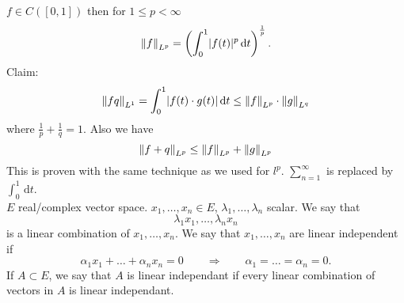\begin{bemerkung}
	$f \in C([0,1])$ then for $1 \leq p < \infty$
	\[
		\norm{f}_{L^p} = \left( \int_{0}^{1} \abs{f(t)}^p \,\mathrm{d}t \right)^{\frac{1}{p}}.
	\]
	Claim:
	\begin{align*}
		\norm{fq}_{L^1} = \int_{0}^{1} \abs{f(t)\cdot g(t)} \,\mathrm{d}t \leq \norm{f}_{L^p} \cdot \norm{g}_{L^q}
	\end{align*}
	where $\frac{1}{p}+ \frac{1}{q}= 1$. Also we have
	\[
		\norm{f+q}_{L^p} \leq \norm{f}_{L^p}+ \norm{g}_{L^p}
	\]
	This is proven with the same technique as we used for $l^p$. $\sum_{n=1}^{\infty}$ is replaced by $\int_{0}^{1} \,\mathrm{d}t$. \\
	$E$ real/complex vector space. $x_1, \dots,x_n \in E$, $\lambda_1, \dots, \lambda_n$ scalar. We say that 
	\[
		\lambda_1 x_1, \dots, \lambda_n x_n
	\]
	is a linear combination of $x_1,\dots,x_n$. We say that $x_1,\dots,x_n$ are linear independent if 
	\[
		\alpha_1 x_1 + \dots + \alpha_n x_n = 0 \qquad \Rightarrow \qquad \alpha_1 = \dots = \alpha_n = 0.
	\]
	If $A \subset E$, we say that $A$ is linear independant if every linear combination of vectors in $A$ is linear independant.
\end{bemerkung}
